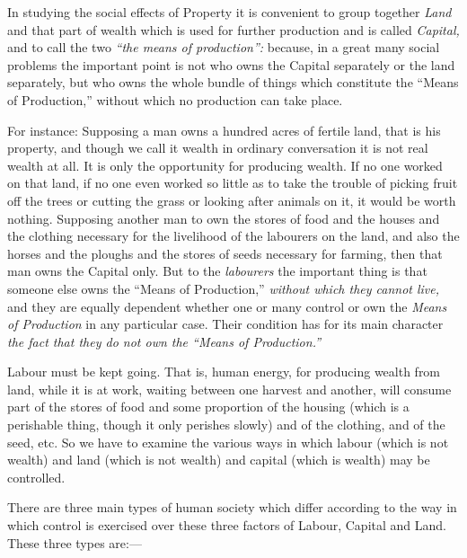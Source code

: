 \documentclass{book}
\begin{document}
In studying the social effects of Property it is convenient to group together \emph{Land} and that part of wealth which is used for further production and is called \emph{Capital,} and to call the two \emph{“the means of production”:} because, in a great many social problems the important point is not who owns the Capital separately or the land separately, but who owns the whole bundle of things which constitute the “Means of Production,” without which no production can take place.

For instance: Supposing a man owns a hundred acres of fertile land, that is his property, and though we call it wealth in ordinary conversation it is not real wealth at all. It is only the opportunity for producing wealth. If no one worked on that land, if no one even worked so little as to take the trouble of picking fruit off the trees or cutting the grass or looking after animals on it, it would be worth nothing. Supposing another man to own the stores of food and the houses and the clothing necessary for the livelihood of the labourers on the land, and also the horses and the ploughs and the stores of seeds necessary for farming, then that man owns the Capital only. But to the \emph{labourers} the important thing is that someone else owns the “Means of Production,” \emph{without which they cannot live,} and they are equally dependent whether one or many control or own the \emph{Means of Production} in any particular case. Their condition has for its main character \emph{the fact that they do not own the “Means of Production.”}

Labour must be kept going. That is, human energy, for producing wealth from land, while it is at work, waiting between one harvest and another, will consume part of the stores of food and some proportion of the housing (which is a perishable thing, though it only perishes slowly) and of the clothing, and of the seed, etc. So we have to examine the various ways in which labour (which is not wealth) and land (which is not wealth) and capital (which is wealth) may be controlled.

There are three main types of human society which differ according to the way in which control is exercised over these three factors of Labour, Capital and Land. These three types are:—
\end{document}
